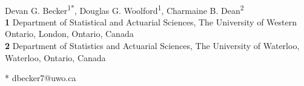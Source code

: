 \documentclass[10pt,letterpaper]{article}
\begin{document}
\vspace*{0.2in}

\begin{flushleft}
{\Large
\textbf{} %
}
\newline
\\
Devan G. Becker\textsuperscript{1*},
Douglas G. Woolford\textsuperscript{1},
Charmaine B. Dean\textsuperscript{2}
\\
\bigskip
\textbf{1} Department of Statistical and Actuarial Sciences, The University of Western Ontario, London, Ontario, Canada
\\
\textbf{2} Department of Statistics and Actuarial Sciences, The University of Waterloo, Waterloo, Ontario, Canada
\\
\bigskip

%
%

* dbecker7@uwo.ca

\end{flushleft}
\end{document}

